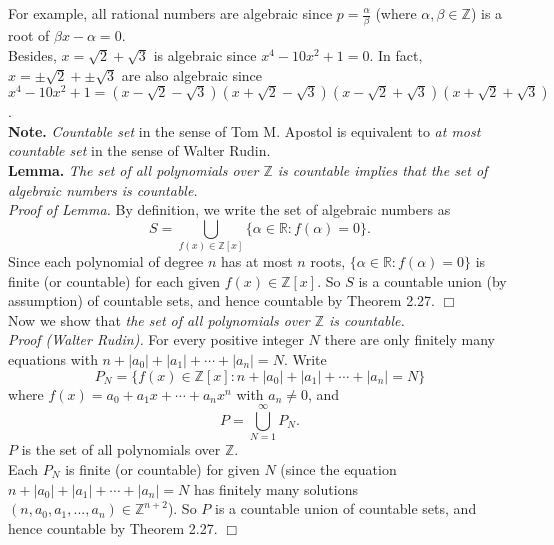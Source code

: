 \documentclass{article}
\begin{document}
For example, all rational numbers are algebraic
since $p = \frac{\alpha}{\beta}$ (where $\alpha, \beta \in \mathbb{Z}$)
is a root of $\beta x - \alpha = 0$. \\

Besides, $x = \sqrt{2} + \sqrt{3}$ is algebraic since $x^4 - 10x^2 + 1 = 0$.
In fact, $x = \pm\sqrt{2} + \pm\sqrt{3}$ are also algebraic since
$x^4 - 10x^2 + 1 =
(x - \sqrt{2} - \sqrt{3})(x + \sqrt{2} - \sqrt{3})
(x - \sqrt{2} + \sqrt{3})(x + \sqrt{2} + \sqrt{3})$. \\

\textbf{Note.} \emph{Countable set} in the sense of Tom M. Apostol
is equivalent to \emph{at most countable set} in the sense of Walter Rudin. \\

\textbf{Lemma.}
\emph{The set of all polynomials over $\mathbb{Z}$ is countable implies that
the set of algebraic numbers is countable.} \\

\emph{Proof of Lemma.}
By definition, we write the set of algebraic numbers as
$$S = \bigcup_{f(x) \in \mathbb{Z}[x]} \{ \alpha \in \mathbb{R} : f(\alpha) = 0 \}.$$
Since each polynomial of degree $n$ has at most $n$ roots,
$\{ \alpha \in \mathbb{R} : f(\alpha) = 0 \}$ is finite (or countable)
for each given $f(x) \in \mathbb{Z}[x]$.
So $S$ is a countable union (by assumption) of countable sets, and hence countable
by Theorem 2.27.
$\Box$ \\

Now we show that
\emph{the set of all polynomials over $\mathbb{Z}$ is countable.} \\

\emph{Proof (Walter Rudin).}
For every positive integer $N$ there are only finitely many equations with
$n + |a_0| + |a_1| + \cdots + |a_n| = N.$
Write
$$P_N = \{ f(x) \in \mathbb{Z}[x] : n + |a_0| + |a_1| + \cdots + |a_n| = N \}$$
where $f(x) = a_0 + a_1 x + \cdots + a_n x^n$ with $a_n \neq 0$,
and
$$P = \bigcup_{N = 1}^{\infty} P_N.$$
$P$ is the set of all polynomials over $\mathbb{Z}$. \\

Each $P_N$ is finite (or countable) for given $N$
(since the equation $n + |a_0| + |a_1| + \cdots + |a_n| = N$
has finitely many solutions
$(n, a_0, a_1, ..., a_n) \in \mathbb{Z}^{n+2}$).
So $P$ is a countable union of countable sets, and hence countable
by Theorem 2.27.
$\Box$ \\
\end{document}
